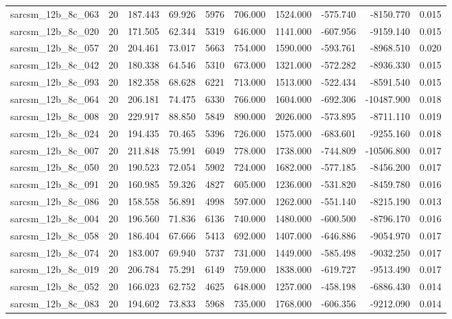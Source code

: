 \begin{tabular}{lrrrrrrrrr}
sarcsm\_12b\_8c\_063 & 20 & 187.443 & 69.926 & 5976 & 706.000 & 1524.000 & -575.740 & -8150.770 & 0.015 \\
sarcsm\_12b\_8c\_020 & 20 & 171.505 & 62.344 & 5319 & 646.000 & 1141.000 & -607.956 & -9159.140 & 0.015 \\
sarcsm\_12b\_8c\_057 & 20 & 204.461 & 73.017 & 5663 & 754.000 & 1590.000 & -593.761 & -8968.510 & 0.020 \\
sarcsm\_12b\_8c\_042 & 20 & 180.338 & 64.546 & 5310 & 673.000 & 1321.000 & -572.282 & -8936.330 & 0.015 \\
sarcsm\_12b\_8c\_093 & 20 & 182.358 & 68.628 & 6221 & 713.000 & 1513.000 & -522.434 & -8591.540 & 0.015 \\
sarcsm\_12b\_8c\_064 & 20 & 206.181 & 74.475 & 6330 & 766.000 & 1604.000 & -692.306 & -10487.900 & 0.018 \\
sarcsm\_12b\_8c\_008 & 20 & 229.917 & 88.850 & 5849 & 890.000 & 2026.000 & -573.895 & -8711.110 & 0.019 \\
sarcsm\_12b\_8c\_024 & 20 & 194.435 & 70.465 & 5396 & 726.000 & 1575.000 & -683.601 & -9255.160 & 0.018 \\
sarcsm\_12b\_8c\_007 & 20 & 211.848 & 75.991 & 6049 & 778.000 & 1738.000 & -744.809 & -10506.800 & 0.017 \\
sarcsm\_12b\_8c\_050 & 20 & 190.523 & 72.054 & 5902 & 724.000 & 1682.000 & -577.185 & -8456.200 & 0.017 \\
sarcsm\_12b\_8c\_091 & 20 & 160.985 & 59.326 & 4827 & 605.000 & 1236.000 & -531.820 & -8459.780 & 0.016 \\
sarcsm\_12b\_8c\_086 & 20 & 158.558 & 56.891 & 4998 & 597.000 & 1262.000 & -551.140 & -8215.190 & 0.013 \\
sarcsm\_12b\_8c\_004 & 20 & 196.560 & 71.836 & 6136 & 740.000 & 1480.000 & -600.500 & -8796.170 & 0.016 \\
sarcsm\_12b\_8c\_058 & 20 & 186.404 & 67.666 & 5413 & 692.000 & 1407.000 & -646.886 & -9054.970 & 0.017 \\
sarcsm\_12b\_8c\_074 & 20 & 183.007 & 69.940 & 5737 & 731.000 & 1449.000 & -585.498 & -9032.250 & 0.017 \\
sarcsm\_12b\_8c\_019 & 20 & 206.784 & 75.291 & 6149 & 759.000 & 1838.000 & -619.727 & -9513.490 & 0.017 \\
sarcsm\_12b\_8c\_052 & 20 & 166.023 & 62.752 & 4625 & 648.000 & 1257.000 & -458.198 & -6886.430 & 0.014 \\
sarcsm\_12b\_8c\_083 & 20 & 194.602 & 73.833 & 5968 & 735.000 & 1768.000 & -606.356 & -9212.090 & 0.014 \\

\end{tabular}
